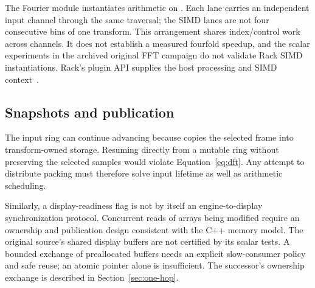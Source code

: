 The Fourier module instantiates arithmetic on . Each lane
carries an independent input channel through the same traversal; the SIMD
lanes are not four consecutive bins of one transform. This arrangement
shares index/control work across channels. It does not establish a measured
fourfold speedup, and the scalar experiments in
the archived original FFT campaign do not validate Rack SIMD instantiations. Rack's plugin API supplies the host processing and SIMD
context~\cite{rack}.

\subsection{Snapshots and publication}
The input ring can continue advancing because  copies the
selected frame into transform-owned storage. Resuming directly from a mutable
ring without preserving the selected samples would violate
Equation~\eqref{eq:dft}. Any attempt to distribute packing must therefore solve
input lifetime as well as arithmetic scheduling.

Similarly, a display-readiness flag is not by itself an engine-to-display
synchronization protocol. Concurrent reads of arrays being modified require an
ownership and publication design consistent with the C++ memory model. The
original source's shared display buffers are not certified by its scalar tests.
A bounded exchange of preallocated buffers needs an explicit slow-consumer
policy and safe reuse; an atomic pointer alone is insufficient. The successor's
ownership exchange is described in Section~\ref{sec:one-hop}.
